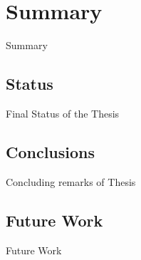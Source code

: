 \chapter{Summary} \label{chapter:summary}

Summary

\section{Status} 
\label{sec:status}

Final Status of the Thesis

\section{Conclusions}
\label{sec:conclusions}

Concluding remarks of Thesis

\section{Future Work} 
\label{sec:futureWork}

Future Work